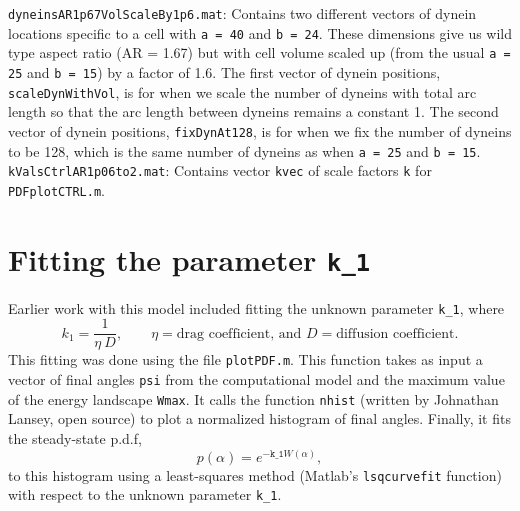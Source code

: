 \documentclass{article}
\begin{document}
\noindent\texttt{dyneinsAR1p67VolScaleBy1p6.mat}: Contains two different vectors of dynein locations specific to a cell with \texttt{a = 40} and \texttt{b = 24}. These dimensions give us wild type aspect ratio (AR = 1.67) but with cell volume scaled up (from the usual \texttt{a = 25} and \texttt{b = 15}) by a factor of 1.6. The first vector of dynein positions, \texttt{scaleDynWithVol}, is for when we scale the number of dyneins with total arc length so that the arc length between dyneins remains a constant 1. The second vector of dynein positions, \texttt{fixDynAt128}, is for when we fix the number of dyneins to be 128, which is the same number of dyneins as when \texttt{a = 25} and \texttt{b = 15}. \\[3pt]

\noindent\texttt{kValsCtrlAR1p06to2.mat}: Contains vector \texttt{kvec} of scale factors \texttt{k} for \texttt{PDFplotCTRL.m}.

\section{Fitting the parameter \texttt{k\_1}}
\label{fit}
Earlier work with this model included fitting the unknown parameter \texttt{k\_1}, where
\[
k_1 = \frac{1}{\eta \: D}, \qquad \eta = \text{drag coefficient, and }D = \text{diffusion coefficient.}
\]
This fitting was done using the file \texttt{plotPDF.m}. This function takes as input a vector of final angles \texttt{psi} from the computational model and the maximum value of the energy landscape \texttt{Wmax}. It calls the function \texttt{nhist} (written by Johnathan Lansey, open source) to plot a normalized histogram of final angles. Finally, it fits the steady-state p.d.f,
\[
p(\alpha) = e^{-\texttt{k\_1}W(\alpha)},
\] 
to this histogram using a least-squares method (Matlab's \texttt{lsqcurvefit} function) with respect to the unknown parameter \texttt{k\_1}.
\end{document}
